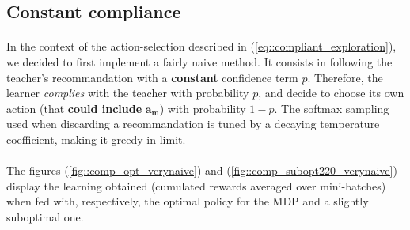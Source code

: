\documentclass[a4paper]{report}
\begin{document}
{{		\subsection{Constant compliance}
		{
			\paragraph{} In the context of the action-selection described in (\ref{eq::compliant_exploration}), we decided to first implement a fairly naive method. It consists in following the teacher's recommandation with a \textbf{constant} confidence term $p$. Therefore, the learner \emph{complies} with the teacher with probability $p$, and decide to choose its own action (that \textbf{could include} $\boldsymbol{a_m}$) with probability $1-p$. The softmax sampling used when discarding a recommandation is tuned by a decaying temperature coefficient, making it greedy in limit.
			
			\paragraph{} The figures (\ref{fig::comp_opt_verynaive}) and (\ref{fig::comp_subopt220_verynaive}) display the learning obtained (cumulated rewards averaged over mini-batches) when fed with, respectively, the optimal policy for the MDP and a slightly suboptimal one. 
			
}}}
\end{document}
